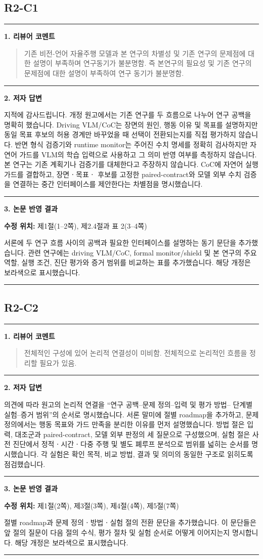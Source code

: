 \documentclass[11pt]{article}
\newcommand{\fieldheading}[2]{%
  \par\medskip\noindent
  {\color{#1}\rule{3pt}{1.25em}}\hspace{0.55em}\textbf{#2}\par\smallskip}
\newenvironment{reviewitem}[1]
  {\subsection*{#1}}
  {\par\medskip\hrule\bigskip}
\newenvironment{reviewercomment}
  {\fieldheading{reviewercolor}{1. 리뷰어 코멘트}%
   \begin{quote}}
  {\end{quote}}
\newenvironment{authorresponse}
  {\fieldheading{responsecolor}{2. 저자 답변}}
  {\par}
\newenvironment{manuscriptrevision}[1]
  {\fieldheading{revisioncolor}{3. 논문 반영 결과}%
   \textbf{수정 위치:} #1\par\smallskip}
  {\par}
\begin{document}
\begin{reviewitem}{R2-C1}
  \begin{reviewercomment}
    기존 비전-언어 자율주행 모델과 본 연구의 차별성 및 기존 연구의 문제점에 대한
    설명이 부족하며 연구동기가 불분명함. 즉 본연구의 필요성 및 기존 연구의
    문제점에 대한 설명이 부족하여 연구 동기가 불분명함.
  \end{reviewercomment}

  \begin{authorresponse}
    지적에 감사드립니다. 개정 원고에서는 기존 연구를 두 흐름으로 나누어 연구
    공백을 명확히 했습니다. Driving VLM/CoC는 장면의 원인, 행동 이유 및 목표를
    설명하지만 동일 목표 후보의 허용 경계만 바꾸었을 때 선택이 전환되는지를
    직접 평가하지 않습니다. 반면 형식 검증기와 runtime monitor는 주어진 수치
    명세를 정확히 검사하지만 자연어 가드를 VLM의 학습 입력으로 사용하고 그
    의미 반영 여부를 측정하지 않습니다. 본 연구는 기존 계획기나 검증기를
    대체한다고 주장하지 않습니다. CoC에 자연어 실행 가드를 결합하고, 장면ㆍ목표ㆍ
    후보를 고정한 paired-contract와 모델 외부 수치 검증을 연결하는 중간
    인터페이스를 제안한다는 차별점을 명시했습니다.
  \end{authorresponse}

  \begin{manuscriptrevision}{제1절(1--2쪽), 제2.4절과 표 2(3--4쪽)}
    서론에 두 연구 흐름 사이의 공백과 필요한 인터페이스를 설명하는 동기 문단을
    추가했습니다. 관련 연구에는 driving VLM/CoC, formal monitor/shield 및 본
    연구의 주요 역할, 실행 조건, 진단 평가와 증거 범위를 비교하는 표를
    추가했습니다. 해당 개정은 보라색으로 표시했습니다.
  \end{manuscriptrevision}
\end{reviewitem}

\begin{reviewitem}{R2-C2}
  \begin{reviewercomment}
    전체적인 구성에 있어 논리적 연결성이 미비함. 전체적으로 논리적인 흐름을
    정리할 필요가 있음.
  \end{reviewercomment}

  \begin{authorresponse}
    의견에 따라 원고의 논리적 연결을 ``연구 공백--문제 정의--입력 및 평가 방법--
    단계별 실험--증거 범위''의 순서로 명시했습니다. 서론 말미에 절별 roadmap을
    추가하고, 문제 정의에서는 행동 목표와 가드 만족을 분리한 이유를 먼저
    설명했습니다. 방법 절은 입력, 대조군과 paired-contract, 모델 외부 판정의 세
    질문으로 구성했으며, 실험 절은 사전 진단에서 정적ㆍ시간ㆍ다중 주행 및 별도
    폐루프 분석으로 범위를 넓히는 순서를 명시했습니다. 각 실험은 확인 목적,
    비교 방법, 결과 및 의미의 동일한 구조로 읽히도록 점검했습니다.
  \end{authorresponse}

  \begin{manuscriptrevision}{제1절(2쪽), 제3절(3쪽), 제4절(4쪽), 제5절(7쪽)}
    절별 roadmap과 문제 정의ㆍ방법ㆍ실험 절의 전환 문단을 추가했습니다. 이
    문단들은 앞 절의 질문이 다음 절의 수식, 평가 절차 및 실험 순서로 어떻게
    이어지는지 명시합니다. 해당 개정은 보라색으로 표시했습니다.
  \end{manuscriptrevision}
\end{reviewitem}
\end{document}
